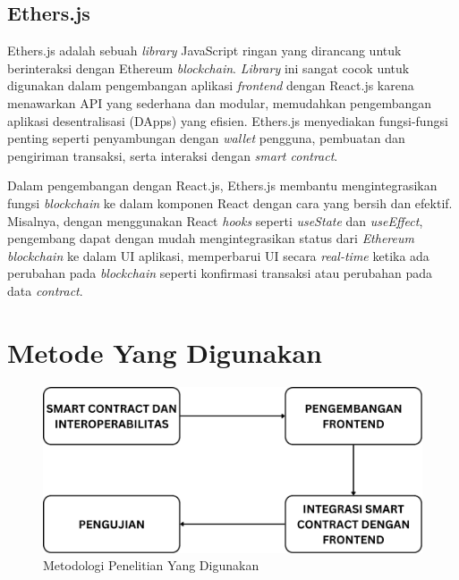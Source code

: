 \subsection{Ethers.js}
Ethers.js adalah sebuah \emph{library} JavaScript ringan yang dirancang untuk berinteraksi dengan Ethereum \emph{blockchain}. \emph{Library} ini sangat cocok untuk digunakan dalam pengembangan aplikasi \emph{frontend} dengan React.js karena menawarkan API yang sederhana dan modular, memudahkan pengembangan aplikasi desentralisasi (DApps) yang efisien. Ethers.js menyediakan fungsi-fungsi penting seperti penyambungan dengan \emph{wallet} pengguna, pembuatan dan pengiriman transaksi, serta interaksi dengan \emph{smart contract}.

Dalam pengembangan dengan React.js, Ethers.js membantu mengintegrasikan fungsi \emph{blockchain} ke dalam komponen React dengan cara yang bersih dan efektif. Misalnya, dengan menggunakan React \emph{hooks} seperti \emph{useState} dan \emph{useEffect}, pengembang dapat dengan mudah mengintegrasikan status dari \emph{Ethereum blockchain} ke dalam UI aplikasi, memperbarui UI secara \emph{real-time} ketika ada perubahan pada \emph{blockchain} seperti konfirmasi transaksi atau perubahan pada data \emph{contract}.



\section{Metode Yang Digunakan}

\begin{figure} [H] \centering
  \includegraphics[scale=0.25]{gambar/metodologi_new.png}
  \caption{Metodologi Penelitian Yang Digunakan}
  \label{fig:flowtransaksi}
\end{figure}

